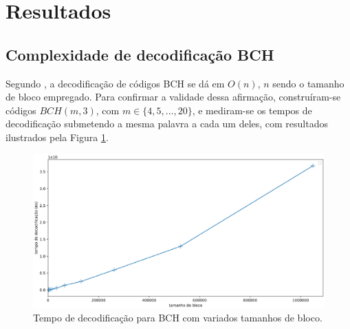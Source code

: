 \section{Resultados}

\subsection{\label{complexidade_decod}Complexidade de decodificação BCH}

Segundo \cite{ref:algoritmo-berlekamp}, a decodificação de códigos BCH se dá em $O(n)$, $n$ sendo o tamanho de bloco empregado. Para confirmar a validade dessa afirmação, construíram-se códigos $BCH(m, 3)$, com $m \in \lbrace 4,5,...,20 \rbrace$, e mediram-se os tempos de decodificação submetendo a mesma palavra a cada um deles, com resultados ilustrados pela Figura \ref{fig:bch_decoding_is_linear}.

\begin{figure}[!hb]
	\centering
    \captionsetup{justification=centering}
	\includegraphics[scale=0.3]{floats/bch-decode-is-linear.eps}
	\caption{\label{fig:bch_decoding_is_linear}Tempo de decodificação para BCH com variados tamanhos de bloco.}
\end{figure}